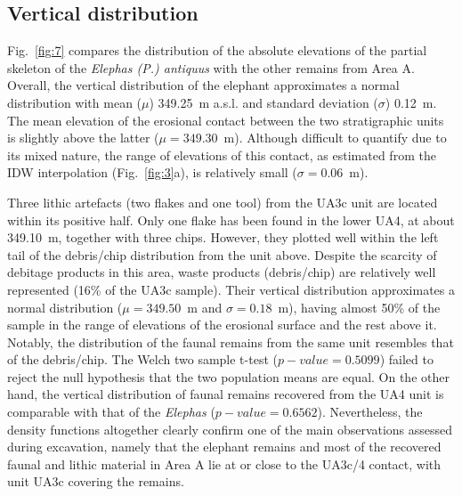 \documentclass[review,authoryear,times]{elsarticle} %
\begin{document}
\subsection{Vertical distribution}



Fig.~\ref{fig:7} compares the distribution of the absolute elevations of the partial skeleton of the \emph{Elephas (P.) antiquus} with the other remains from Area A. Overall, the vertical distribution of the elephant approximates a normal distribution with mean ($\mu$) 349.25~m a.s.l. and standard deviation ($\sigma$) 0.12~m. The mean elevation of the erosional contact between the two stratigraphic units is slightly above the latter ($\mu=349.30$~m). Although difficult to quantify due to its mixed nature, the range of elevations of this contact, as estimated from the IDW interpolation (Fig.~\ref{fig:3}a), is relatively small ($\sigma=0.06$~m).

Three lithic artefacts (two flakes and one tool) from the UA3c unit are located within its positive half. Only one flake has been found in the lower UA4, at about 349.10~m, together with three chips. However, they plotted well within the left tail of the debris/chip distribution from the unit above. Despite the scarcity of debitage products in this area, waste products (debris/chip) are relatively well represented (16\% of the UA3c sample). Their vertical distribution approximates a normal distribution ($\mu=349.50$~m and $\sigma=0.18$~m), having almost 50\% of the sample in the range of elevations of the erosional surface and the rest above it. Notably, the distribution of the faunal remains from the same unit resembles that of the debris/chip. The Welch two sample t-test ($p-value=0.5099$) failed to reject the null hypothesis that the two population means are equal. On the other hand, the vertical distribution of faunal remains recovered from the UA4 unit is comparable with that of the \emph{Elephas} ($p-value=0.6562$).
Nevertheless, the density functions altogether clearly confirm one of the main observations assessed during excavation, namely that the elephant remains and most of the recovered faunal and lithic material in Area A lie at or close to the UA3c/4 contact, with unit UA3c covering the remains.
\end{document}
